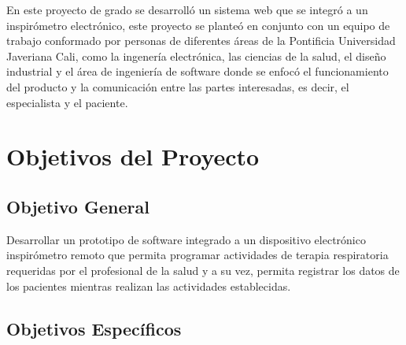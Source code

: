 \documentclass[12pt]{article}
\begin{document}
En este proyecto de grado se desarrolló un sistema web que se integró a un inspir\'ometro electr\'onico, este proyecto se planteó en conjunto con un equipo de trabajo conformado por personas de diferentes \'areas de la Pontificia Universidad Javeriana Cali, como la ingener\'ia electr\'onica, las ciencias de la salud, el dise\~{n}o industrial y el \'area de ingenier\'ia de software donde se enfocó el funcionamiento del producto y la comunicaci\'on entre las partes interesadas, es decir, el especialista y el paciente.








\newpage

\section{Objetivos del Proyecto}

\subsection*{Objetivo General}

Desarrollar un prototipo de software integrado a un dispositivo electr\'onico inspir\'ometro remoto que permita programar actividades de terapia respiratoria requeridas por el profesional de la salud y a su vez, permita registrar los datos de los pacientes mientras realizan las actividades establecidas.

\subsection{Objetivos Específicos}
\label{objetivoses}
\end{document}
